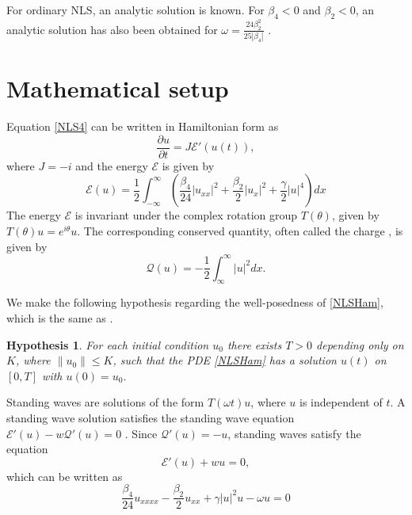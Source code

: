 \documentclass[12pt]{article}
\def\calE{{\mathcal E}}
\def\calQ{{\mathcal Q}}
\newtheorem{hypothesis}{Hypothesis}
\begin{document}
For ordinary NLS, an analytic solution is known. For $\beta_4 < 0$ and $\beta_2 < 0$, an analytic solution has also been obtained for $\omega = \frac{24 \beta_2^2}{25 |\beta_4|}$ \cite{KarllsonHook}. 

\section{Mathematical setup}

Equation \cref{NLS4} can be written in Hamiltonian form as 
\begin{equation}\label{NLSHam}
\frac{\partial u}{\partial t} = J \calE'(u(t)),
\end{equation}
where $J = -i$ and the energy $\calE$ is given by
\begin{equation}\label{defH}
\calE(u) = \frac{1}{2} \int_{-\infty}^\infty \left( \frac{\beta_4}{24}|u_{xx}|^2 + \frac{\beta_2}{2}|u_{x}|^2 + \frac{\gamma}{2} |u|^4 \right) dx
\end{equation}
The energy $\mathcal{E}$ is invariant under the complex rotation group $T(\theta)$, given by $T(\theta)u = e^{i\theta}u$. The corresponding conserved quantity, often called the charge \cite[Section 6.C]{Grillakis1987}, is given by
\begin{equation}\label{defQ}
\mathcal{Q}(u) = -\frac{1}{2} \int_{\infty}^\infty |u|^2 dx.
\end{equation}

We make the following hypothesis regarding the well-posedness of \cref{NLSHam}, which is the same as \cite[Assumption 1]{Grillakis1987}.

\begin{hypothesis}\label{hyp:wp}
For each initial condition $u_0$ there exists $T > 0$ depending only on $K$, where $\|u_0\| \leq K$, such that the PDE \cref{NLSHam} has a solution $u(t)$ on $[0, T]$ with $u(0) = u_0$.
\end{hypothesis}

Standing waves are solutions of the form $T(\omega t) u$, where $u$ is independent of $t$. A standing wave solution satisfies the standing wave equation $\calE'(u) - w \calQ'(u) = 0$ \cite[2.15]{Grillakis1987}. Since $\calQ'(u) = -u$, standing waves satisfy the equation
\begin{equation}\label{standingwaveeq}
\calE'(u) + w u = 0,
\end{equation}
which can be written as
\begin{equation}\label{standingwaveeq2}
\frac{\beta_4}{24}u_{xxxx} - \frac{\beta_2}{2}u_{xx} + \gamma |u|^2 u - \omega u = 0
\end{equation}
\end{document}
